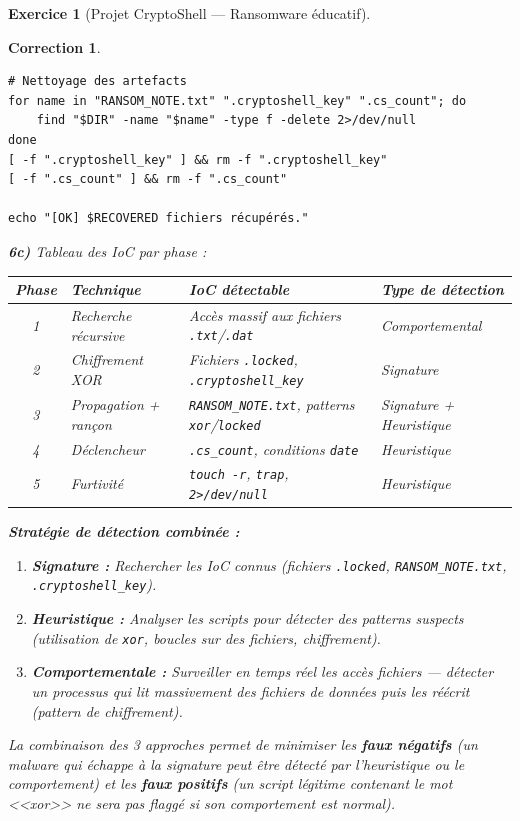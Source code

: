 \documentclass[a4paper,11pt]{article}
\theoremstyle{plain}
\newtheorem{correction}{Correction}
\theoremstyle{definition}
\newtheorem{exercice}{Exercice}
\begin{document}
\begin{exercice}[Projet CryptoShell --- Ransomware éducatif]
\begin{correction}
\begin{lstlisting}[title=recovery.sh (phase6\_recovery.sh)]
# Nettoyage des artefacts
for name in "RANSOM_NOTE.txt" ".cryptoshell_key" ".cs_count"; do
    find "$DIR" -name "$name" -type f -delete 2>/dev/null
done
[ -f ".cryptoshell_key" ] && rm -f ".cryptoshell_key"
[ -f ".cs_count" ] && rm -f ".cs_count"

echo "[OK] $RECOVERED fichiers récupérés."
\end{lstlisting}

\textbf{6c)} Tableau des IoC par phase :

\begin{center}
\begin{tabular}{clp{4cm}l}
\toprule
\textbf{Phase} & \textbf{Technique} & \textbf{IoC détectable} & \textbf{Type de détection} \\
\midrule
1 & Recherche récursive & Accès massif aux fichiers \texttt{.txt}/\texttt{.dat} & Comportemental \\
2 & Chiffrement XOR & Fichiers \texttt{.locked}, \texttt{.cryptoshell\_key} & Signature \\
3 & Propagation + rançon & \texttt{RANSOM\_NOTE.txt}, patterns \texttt{xor}/\texttt{locked} & Signature + Heuristique \\
4 & Déclencheur & \texttt{.cs\_count}, conditions \texttt{date} & Heuristique \\
5 & Furtivité & \texttt{touch -r}, \texttt{trap}, \texttt{2>/dev/null} & Heuristique \\
\bottomrule
\end{tabular}
\end{center}

\textbf{Stratégie de détection combinée :}
\begin{enumerate}
    \item \textbf{Signature :} Rechercher les IoC connus (fichiers \texttt{.locked}, \texttt{RANSOM\_NOTE.txt}, \texttt{.cryptoshell\_key}).
    \item \textbf{Heuristique :} Analyser les scripts pour détecter des patterns suspects (utilisation de \texttt{xor}, boucles sur des fichiers, chiffrement).
    \item \textbf{Comportementale :} Surveiller en temps réel les accès fichiers --- détecter un processus qui lit massivement des fichiers de données puis les réécrit (pattern de chiffrement).
\end{enumerate}

La combinaison des 3 approches permet de minimiser les \textbf{faux négatifs} (un malware qui échappe à la signature peut être détecté par l'heuristique ou le comportement) et les \textbf{faux positifs} (un script légitime contenant le mot <<xor>> ne sera pas flaggé si son comportement est normal).


\end{correction}
\end{exercice}
\end{document}
